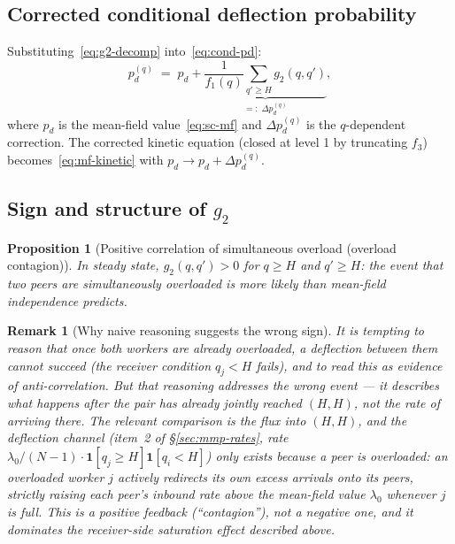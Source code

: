 \documentclass[11pt,a4paper]{article}
\newtheorem{proposition}[theorem]{Proposition}
\newtheorem{remark}{Remark}[section]
\newcommand{\pd}{p_d}
\newcommand{\fone}{f_1}
\newcommand{\gtwo}{g_2}
\begin{document}
\subsection{Corrected conditional deflection probability}

Substituting~\eqref{eq:g2-decomp} into~\eqref{eq:cond-pd}:
\begin{equation}
  \pd^{(q)}
  \;=\; \pd
  + \underbrace{
    \frac{1}{\fone(q)}\sum_{q' \geq H} \gtwo(q, q')
  }_{=:\; \Delta\pd^{(q)}},
  \label{eq:pd-corrected}
\end{equation}
where $\pd$ is the mean-field value~\eqref{eq:sc-mf} and
$\Delta\pd^{(q)}$ is the $q$-dependent correction.
The corrected kinetic equation (closed at level 1 by truncating $f_3$)
becomes~\eqref{eq:mf-kinetic} with $\pd \to \pd + \Delta\pd^{(q)}$.

\subsection{Sign and structure of $\gtwo$}

\begin{proposition}[Positive correlation of simultaneous overload
(overload contagion)]
\label{prop:anticorr}
In steady state, $\gtwo(q, q') > 0$ for $q \geq H$ and $q' \geq H$: the
event that two peers are simultaneously overloaded is \emph{more}
likely than mean-field independence predicts.
\end{proposition}

\begin{remark}[Why naive reasoning suggests the wrong sign]
It is tempting to reason that once both workers are already overloaded,
a deflection between them cannot succeed (the receiver condition
$q_j < H$ fails), and to read this as evidence of anti-correlation. But
that reasoning addresses the wrong event --- it describes what happens
\emph{after} the pair has already jointly reached $(H,H)$, not the
\emph{rate of arriving there}. The relevant comparison is the flux
\emph{into} $(H,H)$, and the deflection channel (item~2 of
\S\ref{sec:mmp-rates}, rate $\lambda_0/(N-1) \cdot
\mathbf{1}[q_j \geq H]\mathbf{1}[q_i<H]$) only \emph{exists} because a
peer is overloaded: an overloaded worker $j$ actively redirects its own
excess arrivals onto its peers, strictly raising each peer's inbound
rate above the mean-field value $\lambda_0$ whenever $j$ is full. This
is a positive feedback (``contagion''), not a negative one, and it
dominates the receiver-side saturation effect described above.
\end{remark}
\end{document}
